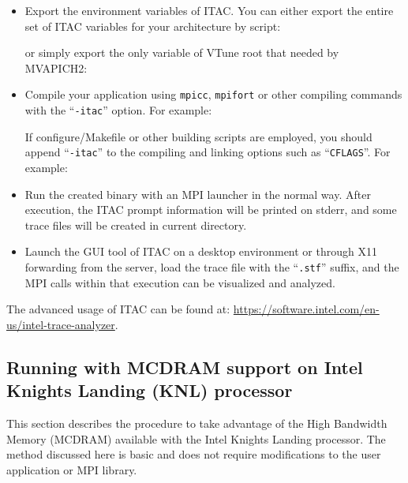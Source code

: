 \begin{itemize}
\item Export the environment variables of ITAC. You can either export the entire set of ITAC variables for your architecture by script:


or simply export the only variable of VTune root that needed by MVAPICH2:


\item Compile your application using \texttt{mpicc}, \texttt{mpifort} or other compiling commands with the ``\texttt{-itac}'' option. For example:


If configure/Makefile or other building scripts are employed, you should append ``\texttt{-itac}'' to the compiling and linking options such as ``\texttt{CFLAGS}''. For example:


\item Run the created binary with an MPI launcher in the normal way. After execution, the ITAC prompt information will be printed on stderr, and some trace files will be created in current directory.

\item Launch the GUI tool of ITAC on a desktop environment or through X11 forwarding from the server, load the trace file with the ``\texttt{.stf}'' suffix, and the MPI calls within that execution can be visualized and analyzed.
\end{itemize}

The advanced usage of ITAC can be found at: \href{https://software.intel.com/en-us/intel-trace-analyzer}{https://software.intel.com/en-us/intel-trace-analyzer}.


\subsection{Running with MCDRAM support on Intel Knights Landing (KNL) processor}
\label{sec:mcdram}

This section describes the procedure to take advantage of the High Bandwidth
Memory (MCDRAM) available with the Intel Knights Landing processor. The method
discussed here is basic and does not require modifications to the user
application or MPI library.

